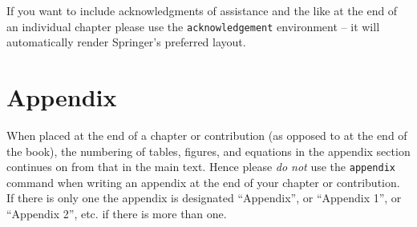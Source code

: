 \documentclass[graybox]{svmult}
\begin{document}








\begin{acknowledgement}
If you want to include acknowledgments of assistance and the like at the end of an individual chapter please use the \verb|acknowledgement| environment -- it will automatically render Springer's preferred layout.
\end{acknowledgement}
%
\section*{Appendix}
%
%
When placed at the end of a chapter or contribution (as opposed to at the end of the book), the numbering of tables, figures, and equations in the appendix section continues on from that in the main text. Hence please \textit{do not} use the \verb|appendix| command when writing an appendix at the end of your chapter or contribution. If there is only one the appendix is designated ``Appendix'', or ``Appendix 1'', or ``Appendix 2'', etc. if there is more than one.

%


\end{document}
